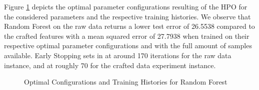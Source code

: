 Figure \ref{fig:RF_Optimal} depicts the optimal parameter configurations resulting of the HPO for the considered parameters and the respective training histories. We observe that Random Forest on the raw data returns a lower test error of 26.5538 compared to the crafted features with a mean squared error of 27.7938 when trained on their respective optimal parameter configurations and with the full amount of samples available. Early Stopping sets in at around 170 iterations for the raw data instance, and at roughly 70 for the crafted data experiment instance. 
\begin{figure}[h]
	\centering
	\caption{Optimal Configurations and Training Histories for Random Forest}
	\label{fig:RF_Optimal}
\end{figure}

